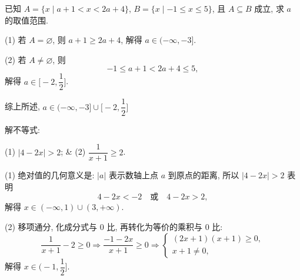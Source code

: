 \begin{example}
    已知 $A=\{x\mid a+1<x<2a+4\}$, $B=\{x\mid -1\leqslant x\leqslant 5\}$, 且 $A\subseteq B$ 成立, 求 $a$ 的取值范围.
\end{example}
\begin{solution}
    (1) 若 $A=\varnothing$, 则 $a+1\geqslant 2a+4$, 解得 $a\in(-\infty,-3]$.
    
    (2) 若 $A\neq\varnothing$, 则 
    \[-1\leqslant a+1< 2a+4\leqslant 5,\]
    解得 $a\in\biggl[-2,\dfrac12\biggr]$.
    
    综上所述, $a\in(-\infty,-3]\cup \biggl[-2,\dfrac12\biggr]$
\end{solution}

\begin{example}
    解不等式:
    \begin{twocolpro}
    (1) $|4-2x|>2$; & (2) $\dfrac1{x+1}\geqslant 2$.
    \end{twocolpro}
\end{example}
\begin{solution}
    (1) 绝对值的几何意义是: $|a|$ 表示数轴上点 $a$ 到原点的距离, 所以 $|4-2x|>2$ 表明
    \[4-2x<-2\quad\text{或}\quad 4-2x>2,\]
    解得 $x\in(-\infty,1)\cup (3,+\infty)$.
    
    (2) 移项通分, 化成分式与 $0$ 比, 再转化为等价的乘积与 $0$ 比:
    \[\frac1{x+1}-2\geqslant 0
        \Rightarrow \frac{-1-2x}{x+1}\geqslant 0
        \Rightarrow \left\{\!\!\begin{array}{l}
            (2x+1)(x+1)\geqslant 0,\\
            x+1\neq 0,
            \end{array}\right. \]
    解得 $x\in \biggl(-1,\dfrac12\biggr]$.
\end{solution}